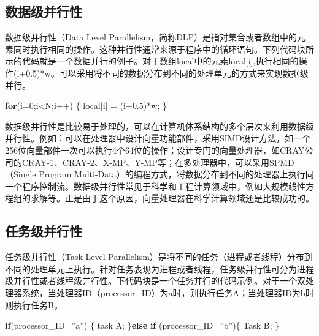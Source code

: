\documentclass[]{ctexbook}
\newenvironment{Shaded}{\begin{snugshade}}{\end{snugshade}}
\newcommand{\ControlFlowTok}[1]{\textcolor[rgb]{0.13,0.29,0.53}{\textbf{#1}}}
\newcommand{\DecValTok}[1]{\textcolor[rgb]{0.00,0.00,0.81}{#1}}
\newcommand{\FloatTok}[1]{\textcolor[rgb]{0.00,0.00,0.81}{#1}}
\newcommand{\NormalTok}[1]{#1}
\begin{document}
\hypertarget{ux6570ux636eux7ea7ux5e76ux884cux6027}{%
\subsection{数据级并行性}\label{ux6570ux636eux7ea7ux5e76ux884cux6027}}

数据级并行性（Data Level Parallelism，简称DLP）是指对集合或者数组中的元素同时执行相同的操作。这种并行性通常来源于程序中的循环语句。下列代码块所示的代码就是一个数据并行的例子。对于数组local中的元素local{[}i{]},执行相同的操作(i+0.5)*w。可以采用将不同的数据分布到不同的处理单元的方式来实现数据级并行。

\begin{Shaded}
\begin{Highlighting}[]
\ControlFlowTok{for}\NormalTok{(i=}\DecValTok{0}\NormalTok{;i\textless{}N;i++) \{}
\NormalTok{    local[i] = (i+}\FloatTok{0.5}\NormalTok{)*w;}
\NormalTok{\}}
\end{Highlighting}
\end{Shaded}

数据级并行性是比较易于处理的，可以在计算机体系结构的多个层次来利用数据级并行性。例如：可以在处理器中设计向量功能部件，采用SIMD设计方法，如一个256位向量部件一次可以执行4个64位的操作；设计专门的向量处理器，如CRAY公司的CRAY-1、CRAY-2、X-MP、Y-MP等；在多处理器中，可以采用SPMD（Single Program Multi-Data）的编程方式，将数据分布到不同的处理器上执行同一个程序控制流。数据级并行性常见于科学和工程计算领域中，例如大规模线性方程组的求解等。正是由于这个原因，向量处理器在科学计算领域还是比较成功的。

\hypertarget{ux4efbux52a1ux7ea7ux5e76ux884cux6027}{%
\subsection{任务级并行性}\label{ux4efbux52a1ux7ea7ux5e76ux884cux6027}}

任务级并行性（Task Level Parallelism）是将不同的任务（进程或者线程）分布到不同的处理单元上执行。针对任务表现为进程或者线程，任务级并行性可分为进程级并行性或者线程级并行性。下代码块是一个任务并行的代码示例。对于一个双处理器系统，当处理器ID（processor\_ID）为a时，则执行任务A；当处理器ID为b时则执行任务B。

\begin{Shaded}
\begin{Highlighting}[]
\ControlFlowTok{if}\NormalTok{(processor\_ID=”a”) \{}
\NormalTok{    task A;}
\NormalTok{\}}\ControlFlowTok{else} \ControlFlowTok{if}\NormalTok{ (processor\_ID=”b”)\{}
\NormalTok{    Task B;}
\NormalTok{\}}
\end{Highlighting}
\end{Shaded}
\end{document}
